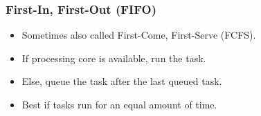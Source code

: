 \begin{frame}

\frametitle{First-In, First-Out (FIFO)}

\begin{itemize}

\item Sometimes also called First-Come, First-Serve (FCFS).

\item If processing core is available, run the task.

\item Else, queue the task after the last queued task.

\item Best if tasks run for an equal amount of time.

\end{itemize}

\end{frame}
